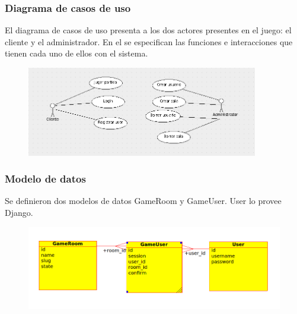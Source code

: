 \documentclass[a4paper,11pt]{article}
\begin{document}
\subsubsection{Diagrama de casos de uso}
	El diagrama de casos de uso presenta a los dos actores presentes en
el juego: el cliente y el administrador. En el se especifican las funciones e
interacciones que tienen cada uno de ellos con el sistema.
\begin{figure}[h!]
	\centering
	\includegraphics[width=0.9\textwidth]{diag_casos_uso.png}
\end{figure}

\subsubsection{Modelo de datos}
Se definieron dos modelos de datos GameRoom y GameUser. User lo provee Django.
\begin{figure}[h!]
	\centering
	\includegraphics[width=\textwidth]{md.png}
\end{figure}

\newpage
\end{document}
